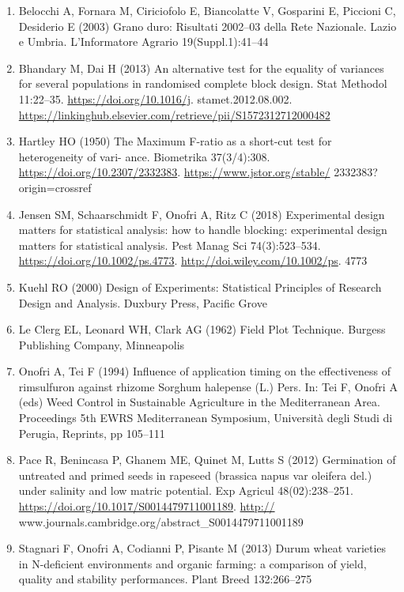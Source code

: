 \documentclass[
  12pt,
]{book}
\providecommand{\tightlist}{%
  \setlength{\itemsep}{0pt}\setlength{\parskip}{0pt}}
\begin{document}
\begin{enumerate}
\def\labelenumi{\arabic{enumi}.}
\tightlist
\item
  Belocchi A, Fornara M, Ciriciofolo E, Biancolatte V, Gosparini E, Piccioni C, Desiderio E (2003) Grano duro: Risultati 2002--03 della Rete Nazionale. Lazio e Umbria. L'Informatore Agrario 19(Suppl.1):41--44
\item
  Bhandary M, Dai H (2013) An alternative test for the equality of variances for several populations in randomised complete block design. Stat Methodol 11:22--35. \url{https://doi.org/10.1016/j}. stamet.2012.08.002. \url{https://linkinghub.elsevier.com/retrieve/pii/S1572312712000482}
\item
  Hartley HO (1950) The Maximum F-ratio as a short-cut test for heterogeneity of vari- ance. Biometrika 37(3/4):308. \url{https://doi.org/10.2307/2332383}. \url{https://www.jstor.org/stable/} 2332383?origin=crossref
\item
  Jensen SM, Schaarschmidt F, Onofri A, Ritz C (2018) Experimental design matters for statistical analysis: how to handle blocking: experimental design matters for statistical analysis. Pest Manag Sci 74(3):523--534. \url{https://doi.org/10.1002/ps.4773}. \url{http://doi.wiley.com/10.1002/ps}. 4773
\item
  Kuehl RO (2000) Design of Experiments: Statistical Principles of Research Design and Analysis. Duxbury Press, Pacific Grove
\item
  Le Clerg EL, Leonard WH, Clark AG (1962) Field Plot Technique. Burgess Publishing Company, Minneapolis
\item
  Onofri A, Tei F (1994) Influence of application timing on the effectiveness of rimsulfuron against rhizome Sorghum halepense (L.) Pers. In: Tei F, Onofri A (eds) Weed Control in Sustainable Agriculture in the Mediterranean Area. Proceedings 5th EWRS Mediterranean Symposium, Università degli Studi di Perugia, Reprints, pp 105--111
\item
  Pace R, Benincasa P, Ghanem ME, Quinet M, Lutts S (2012) Germination of untreated and primed seeds in rapeseed (brassica napus var oleifera del.) under salinity and low matric potential. Exp Agricul 48(02):238--251. \url{https://doi.org/10.1017/S0014479711001189}. \url{http://} www.journals.cambridge.org/abstract\_S0014479711001189
\item
  Stagnari F, Onofri A, Codianni P, Pisante M (2013) Durum wheat varieties in N-deficient environments and organic farming: a comparison of yield, quality and stability performances. Plant Breed 132:266--275

\end{enumerate}
\end{document}
